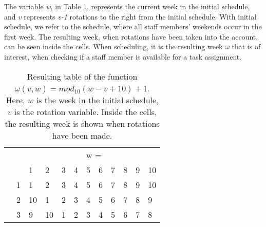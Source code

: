 The variable \textit{w}, in Table \ref{tab:mod}, represents the current week in the initial schedule, and \textit{v} represents \textit{v-1} rotations to the right from the initial schedule. With initial schedule, we refer to the schedule, where all staff members' weekends occur in the first week. The resulting week, when rotations have been taken into the account, can be seen inside the cells. When scheduling, it is the resulting week $\omega$ that is of interest, when checking if a staff member is available for a task assignment. 
\begin{table}[H]
\centering
\caption{Resulting table of the function $\omega(v,w) = mod_{10}(w-v+10)+1$. Here, $w$ is the week in the initial schedule, $v$ is the rotation variable. Inside the cells, the resulting week is shown when rotations have been made.}
\label{tab:mod}
\begin{tabular}{llllllllllll}
    &                         &                         &                         &                         &                         & \multicolumn{2}{l}{w =}                           &                         &                         &                         &                         \\
    &                         & 1                       & 2                       & 3                       & 4                       & 5                       & 6                       & 7                       & 8                       & 9                       & 10                      \\ \cline{3-12} 
    & \multicolumn{1}{l|}{1}  & \multicolumn{1}{l|}{1}  & \multicolumn{1}{l|}{2}  & \multicolumn{1}{l|}{3}  & \multicolumn{1}{l|}{4}  & \multicolumn{1}{l|}{5}  & \multicolumn{1}{l|}{6}  & \multicolumn{1}{l|}{7}  & \multicolumn{1}{l|}{8}  & \multicolumn{1}{l|}{9}  & \multicolumn{1}{l|}{10} \\ \cline{3-12} 
    & \multicolumn{1}{l|}{2}  & \multicolumn{1}{l|}{10} & \multicolumn{1}{l|}{1}  & \multicolumn{1}{l|}{2}  & \multicolumn{1}{l|}{3}  & \multicolumn{1}{l|}{4}  & \multicolumn{1}{l|}{5}  & \multicolumn{1}{l|}{6}  & \multicolumn{1}{l|}{7}  & \multicolumn{1}{l|}{8}  & \multicolumn{1}{l|}{9}  \\ \cline{3-12} 
    & \multicolumn{1}{l|}{3}  & \multicolumn{1}{l|}{9}  & \multicolumn{1}{l|}{10} & \multicolumn{1}{l|}{1}  & \multicolumn{1}{l|}{2}  & \multicolumn{1}{l|}{3}  & \multicolumn{1}{l|}{4}  & \multicolumn{1}{l|}{5}  & \multicolumn{1}{l|}{6}  & \multicolumn{1}{l|}{7}  & \multicolumn{1}{l|}{8}  \\ \cline{3-12} 

\end{tabular}
\end{table}

